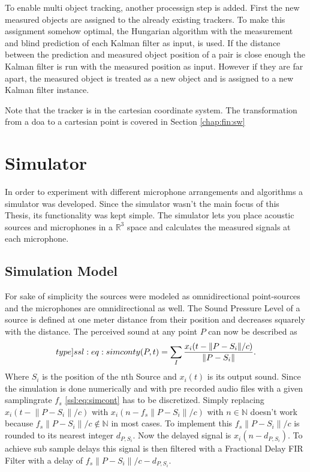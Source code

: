 To enable multi object tracking, another processign step is added.
First the new measured objects are assigned to the already
existing trackers. 
To make this assignment somehow optimal, the Hungarian algorithm \cite{mathsem}
with the measurement and blind prediction of each Kalman filter as input, is used.
If the distance between the prediction and measured object position of a pair is close enough
the Kalman filter is run with the measured position as input.
However if they are far apart, the measured object is treated as a new object
and is assigned to a new Kalman filter instance.

Note that the tracker is in the cartesian coordinate system.
The transformation from a \acrshort*{doa} to a cartesian point is
covered in Section \ref*{chap:fin:sw}

\newpage
\section{Simulator}
In order to experiment with different microphone arrangements and algorithms a simulator was developed.
Since the simulator wasn't the main focus of this Thesis, its functionality was kept simple.
The simulator lets you place acoustic sources and microphones in a $\mathbb{R}^3$ space and calculates
the measured signals at each microphone.

\subsection{Simulation Model}
For sake of simplicity the sources were modeled as omnidirectional point-sources and the
microphones are omnidirectional as well.
The Sound Pressure Level of a source is defined at one meter distance from their position and decreases
squarely with the distance.
The perceived sound at any point $P$ can now be described as
\begin{equation}
	\label[type]{ssl:eq:simcont}
	y(P, t) = \sum_{I} \frac{x_i(t - \lVert P - S_i\rVert/c)}{\lVert P - S_i\rVert}.
\end{equation}
Where $S_i$ is the position of the nth Source and $x_i(t)$ is its output sound.
Since the simulation is done numerically and with pre recorded audio files with a given
samplingrate $f_s$ \eqref{ssl:eq:simcont} has to be discretized.
Simply replacing $x_i(t - \lVert P - S_i\rVert/c)$ with
$x_i(n - f_s \lVert P - S_i\rVert/c)$ with
$n \in \mathbb{N}$ doesn't work because
$f_s \lVert P - S_i\rVert/c \not \in \mathbb{N}$ in most cases.
To implement this $f_s \lVert P - S_i\rVert/c$ is rounded to
its nearest integer $d_{P,S_i}$.
Now the delayed signal is $x_i(n - d_{P,S_i})$.
To achieve sub sample delays this signal is then filtered
with a Fractional Delay FIR Filter with a delay of
$f_s \lVert P - S_i\rVert/c - d_{P,S_i}$.

